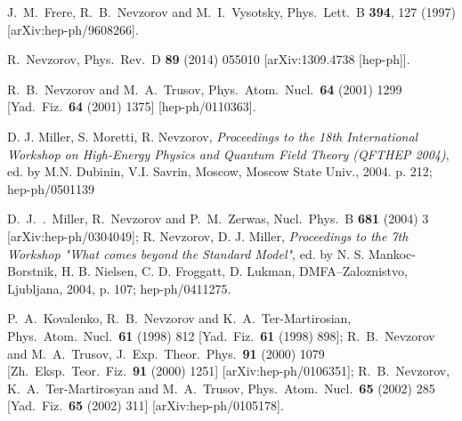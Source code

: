 \documentclass[12pt,a4paper]{article}
\begin{document}
\begin{thebibliography}{999}
J.~M.~Frere, R.~B.~Nevzorov and M.~I.~Vysotsky,
Phys.\ Lett.\  B {\bf 394}, 127 (1997)
[arXiv:hep-ph/9608266].

R.~Nevzorov,
Phys.\ Rev.\ D {\bf 89} (2014) 055010
[arXiv:1309.4738 [hep-ph]].

R.~B.~Nevzorov and M.~A.~Trusov,
Phys.\ Atom.\ Nucl.\  {\bf 64} (2001) 1299
[Yad.\ Fiz.\  {\bf 64} (2001) 1375]
[hep-ph/0110363].

D. J. Miller, S. Moretti, R. Nevzorov, {\it Proceedings to the 18th International
Workshop on High-Energy Physics and Quantum Field Theory (QFTHEP 2004)},
ed. by M.N. Dubinin, V.I. Savrin, Moscow, Moscow State Univ., 2004. p. 212; hep-ph/0501139

D.~J.~.~Miller, R.~Nevzorov and P.~M.~Zerwas,
Nucl.\ Phys.\  B {\bf 681} (2004) 3
[arXiv:hep-ph/0304049];
R. Nevzorov, D. J.  Miller, {\it Proceedings to the 7th Workshop "What comes beyond
the Standard Model"}, ed.  by N. S. Mankoc-Borstnik, H. B. Nielsen, C. D. Froggatt,
D. Lukman, DMFA--Zaloznistvo, Ljubljana, 2004, p. 107; hep-ph/0411275.

P.~A.~Kovalenko, R.~B.~Nevzorov and K.~A.~Ter-Martirosian,
Phys.\ Atom.\ Nucl.\  {\bf 61} (1998) 812
[Yad.\ Fiz.\  {\bf 61} (1998) 898];
R.~B.~Nevzorov and M.~A.~Trusov,
J.\ Exp.\ Theor.\ Phys.\  {\bf 91} (2000) 1079
[Zh.\ Eksp.\ Teor.\ Fiz.\  {\bf 91} (2000) 1251]
[arXiv:hep-ph/0106351];
R.~B.~Nevzorov, K.~A.~Ter-Martirosyan and M.~A.~Trusov,
Phys.\ Atom.\ Nucl.\  {\bf 65} (2002) 285
[Yad.\ Fiz.\  {\bf 65} (2002) 311]
[arXiv:hep-ph/0105178].

\end{thebibliography}
\end{document}

